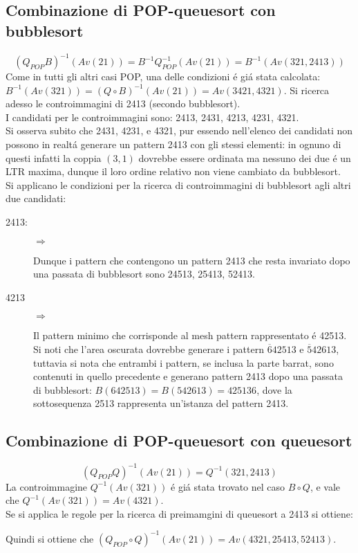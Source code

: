 \subsection*{Combinazione di {POP-queuesort} con {bubblesort}}
$$(Q_{POP}{B})^{-1}(Av(21)) = B^{-1}Q_{POP}^{-1}(Av(21))=B^{-1}(Av(321,2413))$$
Come in tutti gli altri casi POP, una delle condizioni \'e gi\'a stata calcolata: $B^{-1}(Av(321))=(Q\circ{B})^{-1}(Av(21))=Av(3421,4321)$. Si ricerca adesso le controimmagini di 2413 (secondo bubblesort).\\
I candidati per le controimmagini sono: 2413, 2431, 4213, 4231, 4321.\\
Si osserva subito che 2431, 4231, e 4321, pur essendo nell'elenco dei candidati non possono in realt\'a generare un pattern 2413 con gli stessi elementi: in ognuno di questi infatti la coppia $(3,1)$ dovrebbe essere ordinata ma nessuno dei due \'e un LTR maxima, dunque il loro ordine relativo non viene cambiato da bubblesort.\\
Si applicano le condizioni per la ricerca di controimmagini di bubblesort agli altri due candidati:
\begin{description}
	\item[2413:]\begin{center}$\Rightarrow$\end{center}
	Dunque i pattern che contengono un pattern 2413 che resta invariato dopo una passata di bubblesort sono 24513, 25413, 52413.
	\item[4213]\begin{center}$\Rightarrow$\end{center}
	Il pattern minimo che corrisponde al mesh pattern rappresentato \'e 42513.\\
	Si noti che l'area oscurata dovrebbe generare i pattern $\overline{6}42513$ e $\overline{5}42613$, tuttavia si nota che entrambi i pattern, se inclusa la parte barrat, sono contenuti in quello precedente e generano pattern 2413 dopo una passata di bubblesort: $B(642513) = B(542613) =425136$, dove la sottosequenza 2513 rappresenta un'istanza del pattern 2413.
\end{description}
\subsection*{Combinazione di {POP-queuesort} con {queuesort}}
$$(Q_{POP}{Q})^{-1}(Av(21)) = Q^{-1}(321, 2413)$$
La controimmagine $Q^{-1}(Av(321))$ \'e gi\'a stata trovato nel caso $B\circ{Q}$, e vale che $Q^{-1}(Av(321)) = Av(4321)$.\\
Se si applica le regole per la ricerca di preimamgini di queuesort a 2413 si ottiene:
\begin{center}\end{center}
Quindi si ottiene che $(Q_{POP}\circ{Q})^{-1}(Av(21)) = Av(4321, 25413, 52413)$.
